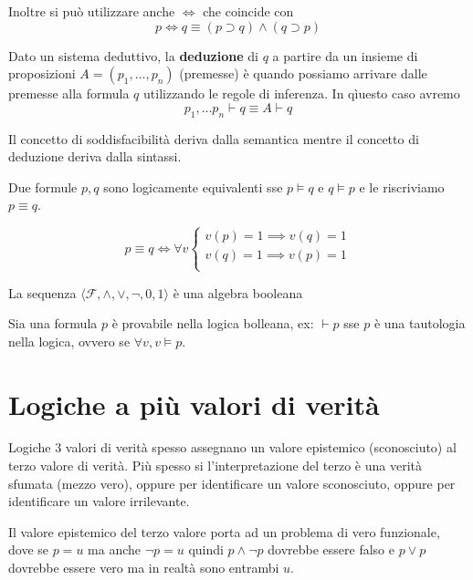 Inoltre si può utilizzare anche $\iff$ che coincide con
$$p\iff q \equiv (p\supset q) \land (q\supset p)$$


\begin{definizione} 
    Dato un sistema deduttivo, la \textbf{deduzione} di $q$ a partire da un insieme
    di proposizioni $A= (p_1,\dots, p_n)$ (premesse) è quando possiamo arrivare 
    dalle premesse alla formula $q$ utilizzando le regole di inferenza. In qìuesto 
    caso avremo 
    $$p_1,\dots p_n \vdash q \equiv A\vdash q$$
\end{definizione}

Il concetto di soddisfacibilità deriva dalla semantica mentre il concetto di 
deduzione deriva dalla sintassi.

\begin{definizione}
    Due formule $p,q$ sono logicamente equivalenti sse $p\vDash q$ e $q\vDash p$
    e le riscriviamo $p\equiv q$.
    
    $$p\equiv q \iff \forall v \begin{cases}
        v(p)=1 \implies v(q)=1\\
        v(q)=1 \implies v(p)=1\\
    \end{cases}$$
\end{definizione}
\begin{teorema}
    La sequenza $\langle \mathcal{F}, \land, \lor, \lnot, 0, 1\rangle$ è una 
    algebra booleana
\end{teorema}

\begin{teorema}
    Sia una formula $p$ è provabile nella logica bolleana, ex: $\vdash p$ sse 
    $p$ è una tautologia  nella logica, ovvero se $\forall v, v\vDash p$.
\end{teorema}


\section{Logiche a più valori di verità}

Logiche 3 valori di verità spesso assegnano un valore epistemico (sconosciuto) al
terzo valore di verità. Più spesso si l'interpretazione del terzo è una verità 
sfumata (mezzo vero), oppure per identificare un valore sconosciuto, oppure per 
identificare un valore irrilevante.

Il valore epistemico del terzo valore porta ad un problema di vero funzionale,
dove se $p=u$ ma anche $\lnot p =u$ quindi $p\land \lnot p$ dovrebbe essere falso 
e $p\lor p$ dovrebbe essere vero ma in realtà sono entrambi $u$.



